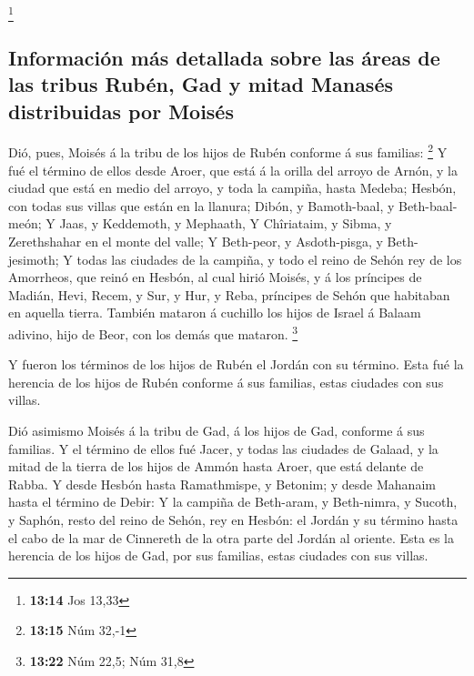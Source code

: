\footnote{\textbf{13:14} Jos 13,33}

\hypertarget{informaciuxf3n-muxe1s-detallada-sobre-las-uxe1reas-de-las-tribus-rubuxe9n-gad-y-mitad-manasuxe9s-distribuidas-por-moisuxe9s}{%
\subsection{Información más detallada sobre las áreas de las tribus
Rubén, Gad y mitad Manasés distribuidas por
Moisés}\label{informaciuxf3n-muxe1s-detallada-sobre-las-uxe1reas-de-las-tribus-rubuxe9n-gad-y-mitad-manasuxe9s-distribuidas-por-moisuxe9s}}

 Dió, pues, Moisés á la tribu de los hijos de Rubén
conforme á sus familias: \footnote{\textbf{13:15} Núm 32,-1}
 Y fué el término de ellos desde Aroer, que está á la
orilla del arroyo de Arnón, y la ciudad que está en medio del arroyo, y
toda la campiña, hasta Medeba;  Hesbón, con todas sus
villas que están en la llanura; Dibón, y Bamoth-baal, y Beth-baal-meón;
 Y Jaas, y Keddemoth, y Mephaath,  Y
Chîriataim, y Sibma, y Zerethshahar en el monte del valle;
 Y Beth-peor, y Asdoth-pisga, y Beth-jesimoth;
 Y todas las ciudades de la campiña, y todo el reino de
Sehón rey de los Amorrheos, que reinó en Hesbón, al cual hirió Moisés, y
á los príncipes de Madián, Hevi, Recem, y Sur, y Hur, y Reba, príncipes
de Sehón que habitaban en aquella tierra.  También
mataron á cuchillo los hijos de Israel á Balaam adivino, hijo de Beor,
con los demás que mataron. \footnote{\textbf{13:22} Núm 22,5; Núm 31,8}

 Y fueron los términos de los hijos de Rubén el Jordán
con su término. Esta fué la herencia de los hijos de Rubén conforme á
sus familias, estas ciudades con sus villas.

 Dió asimismo Moisés á la tribu de Gad, á los hijos de
Gad, conforme á sus familias.  Y el término de ellos fué
Jacer, y todas las ciudades de Galaad, y la mitad de la tierra de los
hijos de Ammón hasta Aroer, que está delante de Rabba.  Y
desde Hesbón hasta Ramathmispe, y Betonim; y desde Mahanaim hasta el
término de Debir:  Y la campiña de Beth-aram, y
Beth-nimra, y Sucoth, y Saphón, resto del reino de Sehón, rey en Hesbón:
el Jordán y su término hasta el cabo de la mar de Cinnereth de la otra
parte del Jordán al oriente.  Esta es la herencia de los
hijos de Gad, por sus familias, estas ciudades con sus villas.

